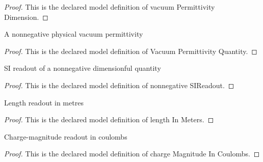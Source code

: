 \begin{proof}
  This is the declared model definition of vacuum Permittivity Dimension.
\end{proof}
\begin{definition}
  \label{def:physics:phyx-mini-0522:phyxminiproblems-problemphyxmini0522-vacuumpermittivityquantity}
  A nonnegative physical vacuum permittivity
\end{definition}
\begin{proof}
  This is the declared model definition of Vacuum Permittivity Quantity.
\end{proof}
\begin{definition}
  \label{def:physics:phyx-mini-0522:phyxminiproblems-problemphyxmini0522-nonnegativesireadout}
  SI readout of a nonnegative dimensionful quantity
\end{definition}
\begin{proof}
  This is the declared model definition of nonnegative SIReadout.
\end{proof}
\begin{definition}
  \label{def:physics:phyx-mini-0522:phyxminiproblems-problemphyxmini0522-lengthinmeters}
  Length readout in metres
\end{definition}
\begin{proof}
  This is the declared model definition of length In Meters.
\end{proof}
\begin{definition}
  \label{def:physics:phyx-mini-0522:phyxminiproblems-problemphyxmini0522-chargemagnitudeincoulombs}
  Charge-magnitude readout in coulombs
\end{definition}
\begin{proof}
  This is the declared model definition of charge Magnitude In Coulombs.
\end{proof}
